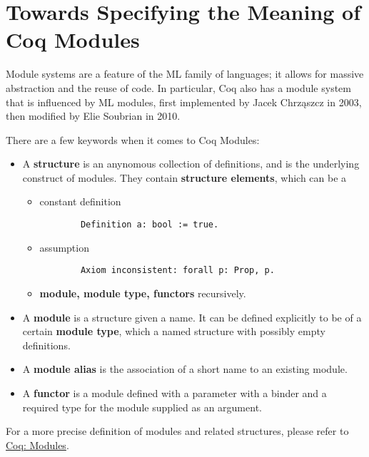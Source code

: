 \section{Towards Specifying the Meaning of Coq Modules}

Module systems are a feature of the ML family of languages; it allows
for massive abstraction and the reuse of code. In particular, Coq 
also has a module system that is influenced by ML modules, first 
implemented by Jacek Chrząszcz in 2003, then modified by Elie Soubrian
in 2010.

There are a few keywords when it comes to Coq Modules:
\begin{itemize}
\item A \textbf{structure} is an anynomous collection of definitions, and is the 
    underlying construct of modules. They contain \textbf{structure elements},
    which can be a
    \begin{itemize}
    \item constant definition
    \begin{verbatim}
        Definition a: bool := true.
    \end{verbatim}
    \item assumption
    \begin{verbatim}
        Axiom inconsistent: forall p: Prop, p.
    \end{verbatim}
    \item \textbf{module, module type, functors} recursively.
    \end{itemize}

\item A \textbf{module} is a structure given a name. It can be defined explicitly to be
    of a certain \textbf{module type}, which a named structure with possibly
    empty definitions.
\item A \textbf{module alias} is the association of a short name to an existing
    module.
\item A \textbf{functor} is a module defined with a parameter with a binder and
    a required type for the module supplied as an argument.
\end{itemize}

For a more precise definition of modules and related structures, please refer to
\href{https://coq.inria.fr/refman/language/core/modules.html}{Coq: Modules}.

